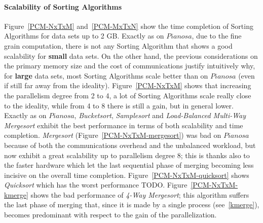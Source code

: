 \paragraph{Scalability of Sorting Algorithms} Figure~\ref{PCM-NxTxM} and~\ref{PCM-MxTxN} show the time completion of Sorting Algorithms for data sets up to 2 GB. Exactly as on $Pianosa$, due to the fine grain computation, there is not any Sorting Algorithm that shows a good scalability for \textbf{small} data sets. On the other hand, the previous considerations on the primary memory size and the cost of communications justify intuitively why, for \textbf{large} data sets, most Sorting Algorithms scale better than on $Pianosa$ (even if still far away from the ideality). Figure~\ref{PCM-NxTxM} shows that increasing the parallelism degree from 2 to 4, a lot of Sorting Algorithms scale really close to the ideality, while from 4 to 8 there is still a gain, but in general lower. Exactly as on $Pianosa$, \textit{Bucketsort}, \textit{Samplesort} and \textit{Load-Balanced Multi-Way Mergesort} exhibit the best performance in terms of both scalability and time completion. \textit{Mergesort} (Figure~\ref{PCM-NxTxM-mergesort}) was bad on $Pianosa$ because of both the communications overhead and the unbalanced workload, but now exhibit a great scalability up to parallelism degree 8; this is thanks also to the faster hardware which let the last sequential phase of merging becoming less incisive on the overall time completion. Figure~\ref{PCM-NxTxM-quicksort} shows \textit{Quicksort} which has the worst performance TODO. Figure~\ref{PCM-NxTxM-kmerge} shows the bad performance of \textit{4-Way Mergesort}; this algorithm suffers the last phase of merging that, since it is made by a single process (see~\ref{kmerge}), becomes predominant with respect to the gain of the parallelization. 

